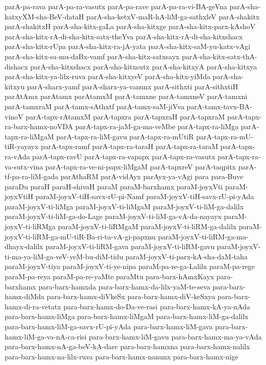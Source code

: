 {parA-pa-rava
parA-pa-ra-vasutx
parA-pa-rave
parA-pa-ra-vi-BA-geVna
parA-sha-katxyXM-sha-BeV-dataH
parA-sha-ketxV-maR-hA-liM-ga-sathxleV
parA-shakitx
parA-shakitxH
parA-sha-kitx-gaLa
parA-sha-kitxge
parA-sha-kitx-parx-kAshoV
parA-sha-kitx-rA-di-sha-kitx-satx-theYva
parA-sha-kitx-rA-di-sha-kitxshacx
parA-sha-kitx-rUpa
parA-sha-kitx-ra-jA-yata
parA-sha-kitx-saM-yu-katx-vAgi
parA-sha-kitx-sa-mu-daBx-vamf
parA-sha-kitx-satxsayx
parA-sha-kitx-satx-thA-dishacx
parA-sha-kitxshacx
parA-sha-kitxsutx
parA-sha-kitxyA
parA-sha-kitxya
parA-sha-kitx-ya-lilx-ruva
parA-sha-kitxyeV
parA-sha-kitx-yiMda
parA-sha-kitxyu
parA-sharx-yamf
parA-sharx-ya-vanunx
parA-sithxti
parA-sithxtiH
parAtAmx
parAtamx
parAtamxM
parA-tamxne
parA-tamxneV
parA-tamxni
parA-tamxraM
parA-tamx-sAthxtf
parA-tamx-saM-jiVva
parA-tamx-tavx-BA-vinoV
parA-tapx-rAtamxM
parA-tapxra
parA-tapxraH
parA-tapxraM
parA-tapx-ra-barx-hamx-noVDA
parA-tapx-ra-jaM-ga-ma-veMbe
parA-tapx-ra-liMga
parA-tapx-ra-liMgaM
parA-tapx-ra-liM-gavu
parA-tapx-ra-mUtiR
parA-tapx-ra-mU-tiR-yayayx
parA-tapx-ramf
parA-tapx-ra-taraH
parA-tapx-ra-taraM
parA-tapx-ra-vAda
parA-tapx-ravU
parA-tapx-ra-vapapx
parA-tapx-ra-vasutx
parA-tapx-ra-va-sutx-vina
parA-tapx-ra-ve-ni-papx-liMgaM
parA-tapxreV
parA-taqpitx
parA-tf-pa-ra-liM-gada
parAthaRM
parA-vidAyx
parAyx-ya-vAgi
para
para-Buve
paraDu
paraH
paraH-shivaH
paraM
paraM-barxhamx
paraM-joyxVti
paraM-joyxVtiH
paraM-joyxV-tiH-savx-rU-pi-Namf
paraM-joyxV-tiH-savx-rU-pi-yAda
paraM-joyxV-ti-liMga
paraM-joyxV-ti-liMgaM
paraM-joyxV-ti-liM-ga-dalilx
paraM-joyxV-ti-liM-ga-do-Lage
paraM-joyxV-ti-liM-ga-vA-da-nayayx
paraM-joyxV-ti-liRMga
paraM-joyxV-ti-liRMgaM
paraM-joyxV-ti-liRM-ga-dalilx
paraM-joyxV-ti-liRM-ga-mU-tiR-Ba-ri-ta-vA-gi-papxnu
paraM-joyxV-ti-liRM-ga-ma-dhayx-dalilx
paraM-joyxV-ti-liRM-gava
paraM-joyxV-ti-liRM-gavu
paraM-joyxV-ti-ma-ya-liM-ga-veV-yeM-bu-diM-tidu
paraM-joyxV-ti-parx-kA-sha-daM-taha
paraM-joyxV-tiya
paraM-joyxV-ti-ye-nipa
paraM-pa-re-ga-Lalilx
paraM-pa-rege
paraM-pa-reya
paraM-pa-re-yaMte
paraMtu
para-barx-hAmxKayx
para-barxhamx
para-barx-hamxda
para-barx-hamx-da-lilx-yaM-te-seva
para-barx-hamx-diMda
para-barx-hamx-diVkeSx
para-barx-hamx-diV-keSxya
para-barx-hamx-di-ra-vetatx
para-barx-hamx-do-Da-ve-rasi
para-barx-hamx-kA-ya-nAda
para-barx-hamx-liMga
para-barx-hamx-liMgaM
para-barx-hamx-liM-ga-dalilx
para-barx-hamx-liM-ga-savx-rU-pi-yAda
para-barx-hamx-liM-gava
para-barx-hamx-liM-ga-va-nA-ca-risi
para-barx-hamx-liM-gavu
para-barx-hamx-ma-ya-vAda
para-barx-hamx-nA-ga-beV-kA-dare
para-barx-hamxna
para-barx-hamx-nalilx
para-barx-hamx-na-lilx-ruva
para-barx-hamx-nanunx
para-barx-hamx-nige
}

